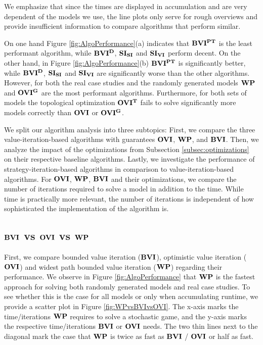 We emphasize that since the times are displayed in accumulation and are very dependent of the models we use, 
the line plots only serve for rough overviews and provide insufficient information to compare algorithms that perform similar.

On one hand Figure \ref{fig:AlgoPerformance}(a) indicates that $\mathbf{BVI^{PT}}$ is the least performant algorithm, while $\mathbf{BVI^D}$, $\mathbf{SI_{SI}}$ and $\mathbf{SI_{VI}}$ perform decent.
On the other hand, in Figure \ref{fig:AlgoPerformance}(b) $\mathbf{BVI^{PT}}$ is significantly better, while $\mathbf{BVI^D}$, $\mathbf{SI_{SI}}$ and $\mathbf{SI_{VI}}$ are significantly worse than the other algorithms.
However, for both the real case studies and the randomly generated models $\mathbf{WP}$ and $\mathbf{OVI^G}$ are the most performant algorithms. 
Furthermore, for both sets of models the topological optimization $\mathbf{OVI^T}$ fails to solve significantly more models correctly than $\mathbf{OVI}$ or $\mathbf{OVI^G}$.

We split our algorithm analysis into three subtopics: 
First, we compare the three value-iteration-based algorithms with guarantees $\mathbf{OVI}$, $\mathbf{WP}$, and $\mathbf{BVI}$. 
Then, we analyze the impact of the optimizations from Subsection \ref{subsec:optimizations} on their respective baseline algorithms.
Lastly, we investigate the performance of strategy-iteration-based algorithms in comparison to value-iteration-based algorithms.
For $\mathbf{OVI}$, $\mathbf{WP}$, $\mathbf{BVI}$ and their optimizations, we compare the number of iterations required to solve a model in addition to the time.
While time is practically more relevant, the number of iterations is independent of how sophisticated the implementation of the algorithm is.
\FloatBarrier

\subsection{$\mathbf{BVI}$ vs $\mathbf{OVI}$ vs $\mathbf{WP}$}
First, we compare bounded value iteration ($\mathbf{BVI}$), optimistic value iteration ($\mathbf{OVI}$) and widest path bounded value iteration ($\mathbf{WP}$) regarding their performance.
We observe in Figure \ref{fig:AlgoPerformance} that $\mathbf{WP}$ is the fastest approach for solving both randomly generated models and real case studies.
To see whether this is the case for all models or only when accumulating runtime, we provide a scatter plot in Figure \ref{fig:WPvsBVIvsOVI}.
The x-axis marks the time/iterations $\mathbf{WP}$ requires to solve a stochastic game, and the y-axis marks the respective time/iterations $\mathbf{BVI}$ or $\mathbf{OVI}$ needs.
The two thin lines next to the diagonal mark the case that $\mathbf{WP}$ is twice as fast as $\mathbf{BVI}$ / $\mathbf{OVI}$ or half as fast.

